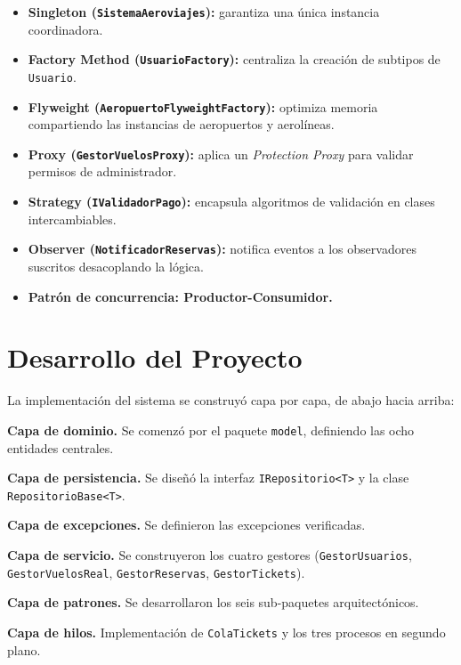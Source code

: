 \documentclass[12pt, letterpaper]{article}
\begin{document}
	\begin{itemize}
		\item \textbf{Singleton (\texttt{SistemaAeroviajes}):} garantiza una única instancia coordinadora.
		\item \textbf{Factory Method (\texttt{UsuarioFactory}):} centraliza la creación de subtipos de \texttt{Usuario}.
		\item \textbf{Flyweight (\texttt{AeropuertoFlyweightFactory}):} optimiza memoria compartiendo las instancias de aeropuertos y aerolíneas.
		\item \textbf{Proxy (\texttt{GestorVuelosProxy}):} aplica un \textit{Protection Proxy} para validar permisos de administrador.
		\item \textbf{Strategy (\texttt{IValidadorPago}):} encapsula algoritmos de validación en clases intercambiables.
		\item \textbf{Observer (\texttt{NotificadorReservas}):} notifica eventos a los observadores suscritos desacoplando la lógica.
		\item \textbf{Patrón de concurrencia: Productor-Consumidor.}
	\end{itemize}
	
	\section{Desarrollo del Proyecto}
	La implementación del sistema se construyó capa por capa, de abajo hacia arriba:
	
	\textbf{Capa de dominio.} Se comenzó por el paquete \texttt{model}, definiendo las ocho entidades centrales.
	
	\textbf{Capa de persistencia.} Se diseñó la interfaz \texttt{IRepositorio<T>} y la clase \texttt{RepositorioBase<T>}.
	
	\textbf{Capa de excepciones.} Se definieron las excepciones verificadas.
	
	\textbf{Capa de servicio.} Se construyeron los cuatro gestores (\texttt{GestorUsuarios}, \texttt{GestorVuelosReal}, \texttt{GestorReservas}, \texttt{GestorTickets}).
	
	\textbf{Capa de patrones.} Se desarrollaron los seis sub-paquetes arquitectónicos.
	
	\textbf{Capa de hilos.} Implementación de \texttt{ColaTickets} y los tres procesos en segundo plano.
	
\end{document}
